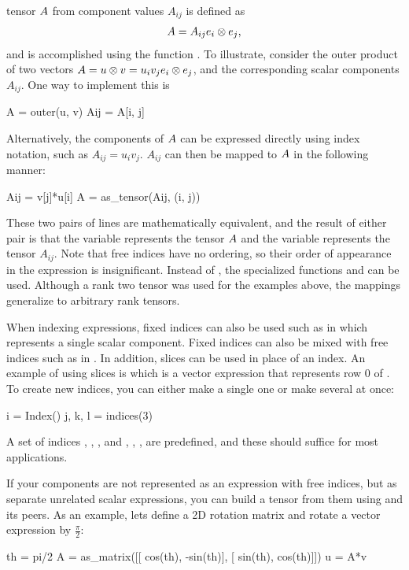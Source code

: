 tensor $\AA$ from component values $A_{ij}$ is defined as
\begin{align}
\AA = A_{ij} \ee_i\otimes\ee_j,
\end{align}
and is accomplished using the function .
To illustrate, consider the outer product of two vectors $\AA =
\uu\otimes\vv = u_i v_j \ee_i\otimes\ee_j$, and the corresponding scalar
components $A_{ij}$.  One way to implement this is
\begin{uflcode}
A = outer(u, v)
Aij = A[i, j]
\end{uflcode}
Alternatively, the components of $\AA$ can be expressed directly using
index notation, such as $A_{ij} = u_i v_j$.  $A_{ij}$ can then be mapped
to $\AA$ in the following manner:
\begin{uflcode}
Aij = v[j]*u[i]
A = as_tensor(Aij, (i, j))
\end{uflcode}
These two pairs of lines are mathematically equivalent, and the result
of either pair is that the variable  represents the tensor $\AA$
and the variable  represents the tensor $A_{ij}$.  Note that free
indices have no ordering, so their order of appearance in the expression
 is insignificant.  Instead of , the
specialized functions  and  can be used.
Although a rank two tensor was used for the examples above, the mappings
generalize to arbitrary rank tensors.

When indexing expressions, fixed indices can also be used such as in
 which represents a single scalar component.  Fixed
indices can also be mixed with free indices such as in .
In addition, slices can be used in place of an index.  An example of
using slices is  which is a vector expression that
represents row 0 of .  To create new indices, you can either
make a single one or make several at once:
\begin{uflcode}
i = Index()
j, k, l = indices(3)
\end{uflcode}
A set of indices , , ,  and
, , ,  are predefined,
and these should suffice for most applications.

If your components are not represented as an expression with free
indices, but as separate unrelated scalar expressions, you can build a
tensor from them using  and its peers.  As an
example, lets define a 2D rotation matrix and rotate a vector
expression by $\frac \pi 2$:
\begin{uflcode}
th = pi/2
A = as_matrix([[ cos(th), -sin(th)],
               [ sin(th),  cos(th)]])
u = A*v
\end{uflcode}

